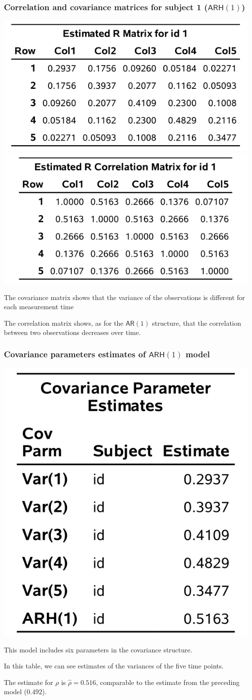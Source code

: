 \documentclass{beamer}
\begin{document}
\begin{frame}[fragile]
\frametitle{Correlation and covariance matrices for subject 1 ($\mathsf{ARH}(1)$)}
\begin{center}
\includegraphics[width = 0.45\linewidth]{img/c5/slides6-e18a}
\includegraphics[width = 0.45\linewidth]{img/c5/slides6-e18b}

\end{center}
\bi
\item The covariance matrix shows that the variance of the observations is different for each measurement time
\item The correlation matrix shows, as for the $\mathsf{AR}(1)$ structure, that the correlation between two observations decreases over time.
\ei
\end{frame}

\begin{frame}[fragile]
\frametitle{Covariance parameters estimates of $\mathsf{ARH}(1)$ model}
\begin{center}
 \includegraphics[width = 0.4\linewidth]{img/c5/slides6-e19}
\end{center}
\bi
\item This model includes six parameters in the covariance structure. 
\item In this table, we can see estimates of the variances of the five time points. 
\item The estimate for $\rho$ is $\hat{\rho}=0.516$, comparable to the estimate from the preceding model ($0.492$).
\ei 
\end{frame}
\end{document}
